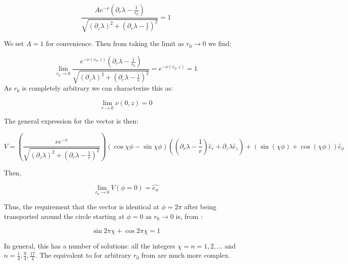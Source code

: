 \documentclass{article}
\begin{document}
\begin{equation}
  \label{eq:conditions}
  \frac{A e^{-\nu}(\partial_r\lambda-\frac{1}{r_0})}{\sqrt{\left(\partial_z\lambda\right)^2+\left(\partial_r\lambda-\frac{1}{r}\right)^2}}=1
\end{equation}

We set $A=1$ for convenience. Then from  taking
the limit as $r_0\rightarrow 0$ we find:

\begin{equation}
  \label{eq:limit-r->0}
  \lim_{r_0\rightarrow 0} \frac{e^{-\nu(r_0,z)}(\partial_r\lambda-\frac{1}{r_0})}{\sqrt{\left(\partial_z\lambda\right)^2+\left(\partial_r\lambda-\frac{1}{r}\right)^2}}=e^{-\nu(r_0,z)}=1
\end{equation}
As $r_0$ is completely arbitrary we can characterize this as:

\begin{equation}
  \label{eq:nu-elem-flat}
  \lim_{r\rightarrow 0}\nu(0,z)=0
\end{equation}

The general expression for the vector is then:

\begin{equation}
\label{eq:v-from-par-transport}
V=\left(\frac{r e^{-\nu}}{\sqrt{\left(\partial_z\lambda\right)^2+\left(\partial_r\lambda-\frac{1}{r}\right)^2}}\right)\left(\cos\chi\phi-\sin\chi\phi\right)\left(\left(\partial_r\lambda-\frac{1}{r}\right)\hat{e}_{r}+\partial_z\lambda\hat{e}_{z}\right)+\left(\sin(\chi\phi)+\cos(\chi\phi)\right)\hat{e}_{\phi}
\end{equation}

Then,

\begin{equation}
  \label{eq:lim-0}
  \lim_{{r_0}\rightarrow 0} V\left(\phi=0\right)=\hat{e_{\phi}}
\end{equation}

Thus, the requirement that the vector is identical at $\phi=2\pi$
after being transported around the circle starting at $\phi=0$ as
$r_0\rightarrow 0$ is, from :

\begin{equation}
  \label{eq:lim-2-pi}
  \sin 2\pi\chi + \cos 2\pi\chi = 1
\end{equation}

In general, this has a number of solutions: all the integers
$\chi=n=1,2,\ldots$ and $n=\frac{1}{4}, \frac{9}{4}, \frac{17}{4}$. The equivalent to  for
arbitrary $r_0$ from  are much more
complex.
\end{document}

